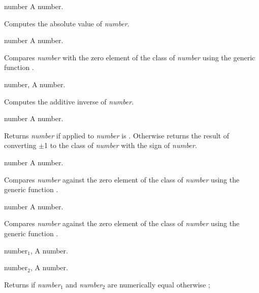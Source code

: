 \begin{optDefinition}
%
\begin{arguments}
    \item[number] A number.
\end{arguments}
%
\result%
Computes the absolute value of {\em number}.

%
\begin{genericargs}
    \item[number] A number.
\end{genericargs}
%
\result%
Compares {\em number\/} with the zero element of the class of {\em number\/}
using the generic function .

%
\begin{genericargs}
    \item[number, \classref{number}] A number.
\end{genericargs}
%
\result%
Computes the additive inverse of {\em number}.

%
\begin{arguments}
    \item[number] A number.
\end{arguments}
%
\result%
Returns {\em number\/} if  applied to {\em number\/} is
\true{}.  Otherwise returns the result of converting $\pm$1 to the class of {\em
    number\/} with the sign of {\em number}.

%
\begin{arguments}
    \item[number] A number.
\end{arguments}
%
\result%
Compares {\em number\/} against the zero element of the class of {\em number\/}
using the generic function .

%
\begin{arguments}
    \item[number] A number.
\end{arguments}
%
\result%
Compares {\em number\/} against the zero element of the class of {\em number\/}
using the generic function .

%
\begin{genericargs}
    \item[number$_1$, \classref{number}] A number.
    \item[number$_2$, \classref{number}] A number.
\end{genericargs}
%
\result%
Returns \true{} if {\em number$_1$} and {\em number$_2$} are numerically equal
otherwise \nil{};


\end{optDefinition}
